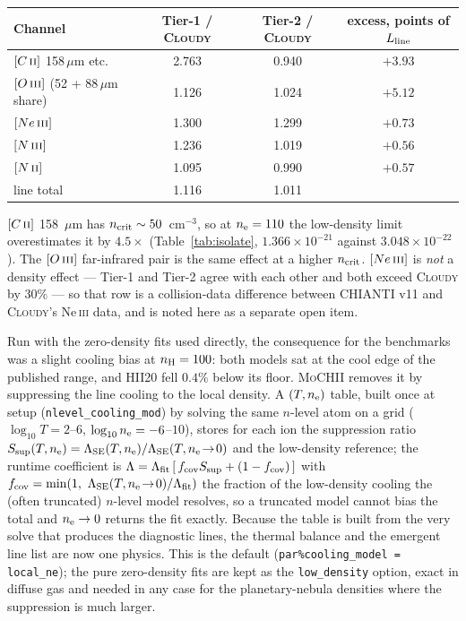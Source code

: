 \documentclass[english,a4paper]{my_memo}
\newcommand{\code}[1]{\texttt{#1}}
\newcommand{\MoCHII}{\textsc{MoCHII}}
\newcommand{\Cloudy}{\textsc{Cloudy}}
\newcommand{\OIII}{O\,\textsc{iii}}
\newcommand{\NII}{N\,\textsc{ii}}
\newcommand{\NIII}{N\,\textsc{iii}}
\newcommand{\CII}{C\,\textsc{ii}}
\newcommand{\NeIII}{Ne\,\textsc{iii}}
\newcommand{\nel}{n_{\rm e}}
\newcommand{\nH}{n_{\rm H}}
\newcommand{\ncrit}{n_{\rm crit}}
\begin{document}
\begin{center}
\begin{tabular}{lccc}
\toprule
Channel & Tier-1 / \Cloudy{} & Tier-2 / \Cloudy{} & excess, points of $L_{\rm line}$ \\
\midrule
$[\CII{}]$ 158\,$\mu$m etc. & 2.763 & 0.940 & $+3.93$ \\
$[\OIII{}]$ (52 + 88\,$\mu$m share) & 1.126 & 1.024 & $+5.12$ \\
$[\NeIII{}]$ & 1.300 & 1.299 & $+0.73$ \\
$[\NIII{}]$  & 1.236 & 1.019 & $+0.56$ \\
$[\NII{}]$   & 1.095 & 0.990 & $+0.57$ \\
\midrule
line total & 1.116 & 1.011 & \\
\bottomrule
\end{tabular}
\end{center}

$[\CII{}]$ 158~$\mu$m has $\ncrit \sim 50$~cm$^{-3}$, so at $\nel = 110$ the
low-density limit overestimates it by $4.5\times$ (Table~\ref{tab:isolate},
$1.366\times10^{-21}$ against $3.048\times10^{-22}$).  The $[\OIII{}]$
far-infrared pair is the same effect at a higher $\ncrit$.  $[\NeIII{}]$ is
\emph{not} a density effect --- Tier-1 and Tier-2 agree with each other and
both exceed \Cloudy{} by $30\%$ --- so that row is a collision-data difference
between CHIANTI v11 and \Cloudy{}'s Ne\,\textsc{iii} data, and is noted here
as a separate open item.

Run with the zero-density fits used directly, the consequence for the
benchmarks was a slight cooling bias at $\nH = 100$: both models sat at the cool
edge of the published range, and HII20 fell $0.4\%$ below its floor.  \MoCHII{}
removes it by suppressing the line cooling to the local density.  A $(T, \nel)$ table,
built once at setup (\code{nlevel\_cooling\_mod}) by solving the same
$n$-level atom on a grid ($\log_{10}T = 2$--$6$, $\log_{10}\nel = -6$--$10$),
stores for each ion the suppression ratio
$S_{\rm sup}(T,\nel) = \Lambda_{\rm SE}(T,\nel)/\Lambda_{\rm SE}(T,\nel\!\to\!0)$
and the low-density reference; the runtime coefficient is
$\Lambda = \Lambda_{\rm fit}\,[\,f_{\rm cov}S_{\rm sup} + (1-f_{\rm cov})\,]$
with $f_{\rm cov} = \min(1,\ \Lambda_{\rm SE}(T,\nel\!\to\!0)/\Lambda_{\rm fit})$
the fraction of the low-density cooling the (often truncated) $n$-level model
resolves, so a truncated model cannot bias the total and $\nel \to 0$ returns
the fit exactly.  Because the table is built from the very solve that produces
the diagnostic lines, the thermal balance and the emergent line list are now
one physics.  This is the default (\code{par\%cooling\_model = local\_ne}); the
pure zero-density fits are kept as the \code{low\_density} option, exact in
diffuse gas and needed in any case for the planetary-nebula densities where the
suppression is much larger.
\end{document}
